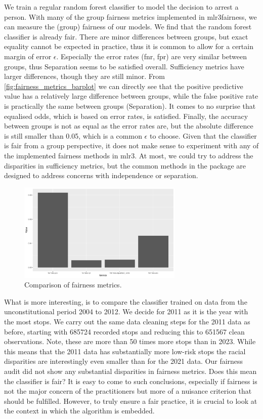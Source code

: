 We train a regular random forest classifier to model the decision to arrest a person. With many of the group fairness metrics implemented in mlr3fairness, we can measure the (group) fairness of our models.
We find that the random forest classifier is already fair. There are minor differences between groups, but exact equality cannot be expected in practice, thus it is common to allow for a certain margin of error $\epsilon$.
Especially the error rates (fnr, fpr) are very similar between groups, thus Separation seems to be satisfied overall. Sufficiency metrics have larger differences, though they are still minor. From \autoref{fig:fairness_metrics_barplot} we can directly see that the positive predictive value has a relatively large difference between groups, while the false positive rate is practically the same between groups (Separation). It comes to no surprise that equalised odds, which is based on error rates, is satisfied. Finally, the accuracy between groups is not as equal as the error rates are, but the absolute difference is still smaller than 0.05, which is a common $\epsilon$ to choose.
Given that the classifier is fair from a group perspective, it does not make sense to experiment with any of the implemented fairness methods in mlr3. At most, we could try to address the disparities in sufficiency metrics, but the common methods in the package are designed to address concerns with independence or separation.
\begin{figure}
    \centering
    \includegraphics[width=0.7\textwidth]{../figures/sqf_case_study_plot2.png}
    \caption{Comparison of fairness metrics.}
    \label{fig:fairness_metrics_barplot}
\end{figure}

What is more interesting, is to compare the classifier trained on data from the unconstitutional period 2004 to 2012. We decide for 2011 as it is the year with the most stops.
We carry out the same data cleaning steps for the 2011 data as before, starting with 685724 recorded stops and reducing this to 651567 clean observations. Note, these are more than 50 times more stops than in 2023.
While this means that the 2011 data has substantially more low-risk stops the racial disparities are interestingly even smaller than for the 2021 data.
Our fairness audit did not show any substantial disparities in fairness metrics. Does this mean the classifier is fair?
It is easy to come to such conclusions, especially if fairness is not the major concern of the practitioners but more of a nuisance criterion that should be fulfilled. However, to truly ensure a fair practice, it is crucial to look at the context in which the algorithm is embedded.



